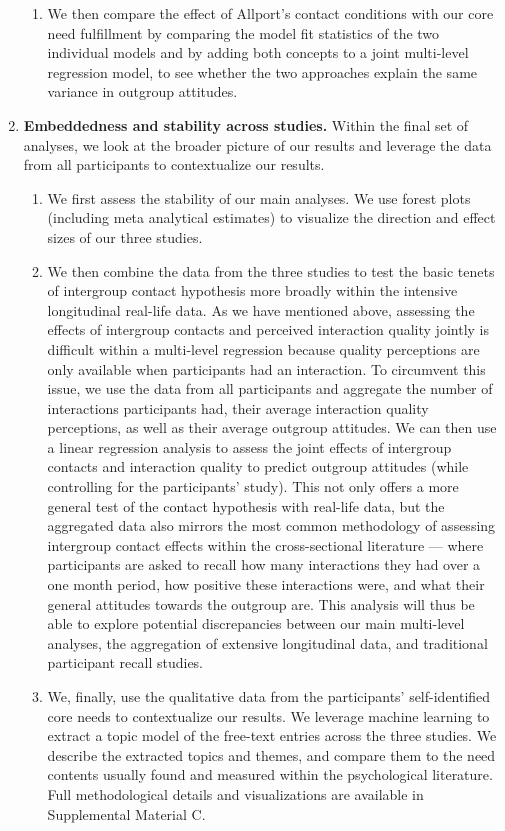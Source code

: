 \documentclass[man, 12pt, a4paper, mask]{apa7}
\theoremstyle{break}
\theoremstyle{plain}
\begin{document}
\begin{enumerate}
\begin{enumerate}
        \item We then compare the effect of Allport's contact conditions with our core need fulfillment by comparing the model fit statistics of the two individual models and by adding both concepts to a joint multi-level regression model, to see whether the two approaches explain the same variance in outgroup attitudes.
    \end{enumerate}
    \item \textbf{Embeddedness and stability across studies.} Within the final set of analyses, we look at the broader picture of our results and leverage the data from all participants to contextualize our results.  
    \begin{enumerate}
        \item We first assess the stability of our main analyses. We use forest plots (including meta analytical estimates) to visualize the direction and effect sizes of our three studies. 
        \item We then combine the data from the three studies to test the basic tenets of intergroup contact hypothesis more broadly within the intensive longitudinal real-life data. As we have mentioned above, assessing the effects of intergroup contacts and perceived interaction quality jointly is difficult within a multi-level regression because quality perceptions are only available when participants had an interaction. To circumvent this issue, we use the data from all participants and aggregate the number of interactions participants had, their average interaction quality perceptions, as well as their average outgroup attitudes. We can then use a linear regression analysis to assess the joint effects of intergroup contacts and interaction quality to predict outgroup attitudes (while controlling for the participants' study). This not only offers a more general test of the contact hypothesis with real-life data, but the aggregated data also mirrors the most common methodology of assessing intergroup contact effects within the cross-sectional literature --- where participants are asked to recall how many interactions they had over a one month period, how positive these interactions were, and what their general attitudes towards the outgroup are. This analysis will thus be able to explore potential discrepancies between our main multi-level analyses, the aggregation of extensive longitudinal data, and traditional participant recall studies.
        \item We, finally, use the qualitative data from the participants' self-identified core needs to contextualize our results. We leverage machine learning to extract a topic model of the free-text entries across the three studies. We describe the extracted topics and themes, and compare them to the need contents usually found and measured within the psychological literature. Full methodological details and visualizations are available in Supplemental Material C.
    \end{enumerate}
\end{enumerate}
\end{document}

